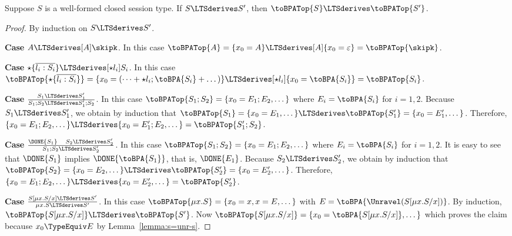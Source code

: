 \begin{lemma}\label{lemma:app:bisimulation-BPA-forwards}
  Suppose $S$ is a well-formed closed session type.
  If $S \LTSderives S'$, then $\toBPATop{S}
  \LTSderives \toBPATop{S'}$.
\end{lemma}
\begin{proof}
  By induction on  $S \LTSderives S'$.

  \textbf{Case }$A \LTSderives[A] \skipk$.
  In this case $\toBPATop{A} = \{ x_0 = A \} \LTSderives[A] \{ x_0 =
  \varepsilon \} = \toBPATop{\skipk}$.

  \textbf{Case }$\star\{\overline{l_i:S_i}\} \LTSderives[\star l_i]
  S_i$.
  In this case $\toBPATop{\star\{\overline{l_i:S_i}\}} = \{ x_0 =
  (\dots+ \star l_i; \toBPA{S_i} + \dots) \} \LTSderives [\star l_i]
  \{ x_0 = \toBPA{S_i} \} =  \toBPATop{S_i}$.

  \textbf{Case }$\frac{S_1 \LTSderives S_1'}{S_1; S_2
    \LTSderives S_1';S_2}$.
  In this case $\toBPATop{S_1;S_2} = \{ x_0 = E_1;E_2, \dots \}$ where
  $E_i = \toBPA{S_i}$ for $i=1,2$.
  Because $S_1 \LTSderives S_1'$,
  we obtain by induction that $\toBPATop{S_1} = \{ x_0 = E_1, \dots \}
  \LTSderives \toBPATop{S_1'} = \{ x_0 = E_1', \dots
  \}$. Therefore, $\{ x_0 = E_1;E_2, \dots \} \LTSderives \{ x_0 =
  E_1';E_2, \dots \} = \toBPATop{S_1'; S_2}$.

  \textbf{Case }$\frac{\DONE{S_1} \quad S_2 \LTSderives S_2'}{S_1; S_2
    \LTSderives S_2'}$.
  In this case $\toBPATop{S_1;S_2} = \{ x_0 = E_1;E_2, \dots \}$ where
  $E_i = \toBPA{S_i}$ for $i=1,2$.
  It is easy to see that $\DONE{S_1}$ implies $\DONE{\toBPA{S_1}}$,
  that is, $\DONE{E_1}$.
  Because $S_2 \LTSderives S_2'$,
  we obtain by induction that $\toBPATop{S_2} = \{ x_0 = E_2, \dots \}
  \LTSderives \toBPATop{S_2'} = \{ x_0 = E_2', \dots
  \}$. 
  Therefore, $\{ x_0 = E_1;E_2, \dots \} \LTSderives \{ x_0 =
  E_2', \dots \} = \toBPATop{S_2'}$.

  \textbf{Case }$\frac{S[\mu x.S/x] \LTSderives S'}{\mu x.S
    \LTSderives S'}$.
  In this case
  $\toBPATop{\mu x.S} = \{ x_0 = x, x = E, \dots \}$ with $E = \toBPA{\Unravel
    (S[\mu x.S/x])}$.
  By induction, $\toBPATop{S[\mu x.S/x]} \LTSderives
  \toBPATop{S'}$.
  Now $\toBPATop{S[\mu x.S/x]} = \{ x_0 = \toBPA{S[\mu x.S/x]}, \dots
  \}$ which proves the claim because $x_0 \TypeEquiv E$ by
  Lemma~\ref{lemma:s=unr-s}. 
\end{proof}


